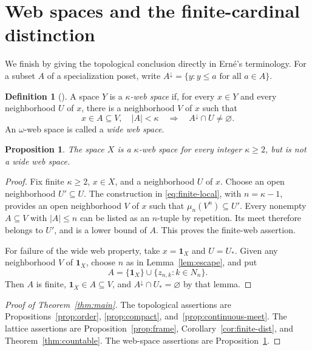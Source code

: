 \documentclass[11pt]{amsart}
\newtheorem{proposition}[theorem]{Proposition}
\theoremstyle{definition}
\newtheorem{definition}[theorem]{Definition}
\theoremstyle{remark}
\numberwithin{equation}{section}
\newcommand{\tops}{\mathbf 1_X}
\begin{document}
\section{Web spaces and the finite-cardinal distinction}
\label{sec:web}

We finish by giving the topological conclusion directly in
Ern\'e's terminology. For a subset $A$ of a specialization poset,
write $A^{\downarrow}=\{y:y\leq a\text{ for all }a\in A\}$.

\begin{definition}[{\cite[Section~6]{Erne2009}}]\label{def:web}
A space $Y$ is a \emph{$\kappa$-web space} if, for every $x\in Y$
and every neighborhood $U$ of $x$, there is a neighborhood $V$ of
$x$ such that
\[
x\in A\subseteq V,\quad |A|<\kappa
\quad\Longrightarrow\quad A^{\downarrow}\cap U\ne\varnothing.
\]
An $\omega$-web space is called a \emph{wide web space}.
\end{definition}

\begin{proposition}\label{prop:web}
The space $X$ is a $\kappa$-web space for every integer
$\kappa\geq2$, but is not a wide web space.
\end{proposition}

\begin{proof}
Fix finite $\kappa\geq2$, $x\in X$, and a neighborhood $U$ of $x$.
Choose an open neighborhood $U'\subseteq U$.
The construction in \eqref{eq:finite-local}, with $n=\kappa-1$,
provides an open neighborhood $V$ of $x$ such that
$\mu_n(V^n)\subseteq U'$.
Every nonempty $A\subseteq V$ with $|A|\leq n$ can be listed as
an $n$-tuple by repetition. Its meet therefore belongs to $U'$,
and is a lower bound of $A$. This proves the finite-web assertion.

For failure of the wide web property, take $x=\tops$ and $U=U_*$.
Given any neighborhood $V$ of $\tops$, choose $n$ as in
Lemma~\ref{lem:escape}, and put
\[
A=\{\tops\}\cup\{z_{n,k}:k\in N_n\}.
\]
Then $A$ is finite, $\tops\in A\subseteq V$, and
$A^{\downarrow}\cap U_*=\varnothing$ by that lemma.
\end{proof}

\begin{proof}[Proof of Theorem~\ref{thm:main}]
The topological assertions are Propositions~\ref{prop:order},
\ref{prop:compact}, and~\ref{prop:continuous-meet}.
The lattice assertions are Proposition~\ref{prop:frame},
Corollary~\ref{cor:finite-dist}, and Theorem~\ref{thm:countable}.
The web-space assertions are Proposition~\ref{prop:web}.
\end{proof}
\end{document}
